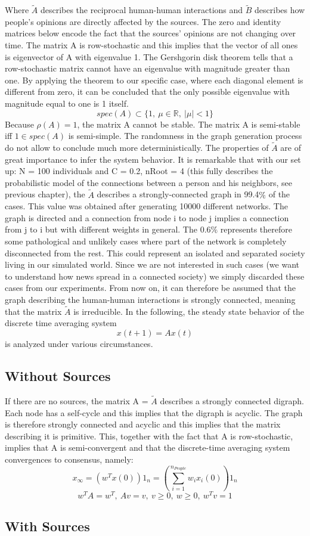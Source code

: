 Where $\tilde{A}$ describes the reciprocal human-human interactions and $\tilde{B}$ describes how people's opinions are directly affected by the sources. The zero and identity matrices below encode the fact that the sources' opinions are not changing over time. \newline
The matrix A is row-stochastic and this implies that the vector of all ones is eigenvector of A with eigenvalue 1. The Gershgorin disk theorem tells that a row-stochastic matrix cannot have an eigenvalue with magnitude greater than one. By applying the theorem to our specific case, where each diagonal element is different from zero, it can be concluded that the only possible eigenvalue with magnitude equal to one is 1 itself. \newline
$$
spec(A) \subset \{1,\ \mu \in \mathbb{R},\ | \mu | < 1\}
$$
Because $\rho(A) = 1$, the matrix A cannot be stable. The matrix A is semi-stable iff $1 \in spec(A)$ is semi-simple. \newline
The randomness in the graph generation process do not allow to conclude much more deterministically. The properties of $\tilde{A}$ are of great importance to infer the system behavior. It is remarkable that with our set up: N = 100 individuals and C = 0.2, nRoot = 4 (this fully describes the probabilistic model of the connections between a person and his neighbors, see previous chapter), the $\tilde{A}$ describes a strongly-connected graph in 99.4$\%$ of the cases. This value was obtained after generating 10000 different networks. The graph is directed and a connection from node i to node j implies a connection from j to i but with different weights in general. The 0.6$\%$ represents therefore some pathological and unlikely cases where part of the network is completely disconnected from the rest. This could represent an isolated and separated society living in our simulated world. Since we are not interested in such cases (we want to understand how news spread in a connected society) we simply discarded these cases from our experiments. From now on, it can therefore be assumed that the graph describing the human-human interactions is strongly connected, meaning that the matrix $\tilde{A}$ is irreducible. In the following, the steady state behavior of the discrete time averaging system 
$$
x(t+1) = Ax(t)
$$
is analyzed under various circumstances.
\subsection{Without Sources}
If there are no sources, the matrix A = $\tilde{A}$ describes a strongly connected digraph. Each node has a self-cycle and this implies that the digraph is acyclic. The graph is therefore strongly connected and acyclic and this implies that the matrix describing it is primitive. This, together with the fact that A is row-stochastic, implies that A is semi-convergent and that the discrete-time averaging system convergences to consensus, namely:
$$
x_{\infty} = (w^Tx(0))1_n = (\sum_{i=1}^{n_{People}}w_ix_i(0))1_n
$$
$$
w^TA = w^T,\ 
Av = v,\ 
v \geq 0,\ w \geq 0,\ w^Tv = 1
$$
\subsection{With Sources}


